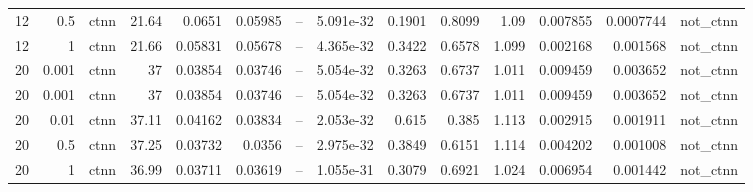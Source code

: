 \begin{table}
\begin{tabular}{lrrrrrrrrrrrrr}
12 & 0.5 & ctnn & 21.64 & 0.0651 & 0.05985 & -- & 5.091e-32 & 0.1901 & 0.8099 & 1.09 & 0.007855 & 0.0007744 & not\_ctnn \\
12 & 1 & ctnn & 21.66 & 0.05831 & 0.05678 & -- & 4.365e-32 & 0.3422 & 0.6578 & 1.099 & 0.002168 & 0.001568 & not\_ctnn \\
20 & 0.001 & ctnn & 37 & 0.03854 & 0.03746 & -- & 5.054e-32 & 0.3263 & 0.6737 & 1.011 & 0.009459 & 0.003652 & not\_ctnn \\
20 & 0.001 & ctnn & 37 & 0.03854 & 0.03746 & -- & 5.054e-32 & 0.3263 & 0.6737 & 1.011 & 0.009459 & 0.003652 & not\_ctnn \\
20 & 0.01 & ctnn & 37.11 & 0.04162 & 0.03834 & -- & 2.053e-32 & 0.615 & 0.385 & 1.113 & 0.002915 & 0.001911 & not\_ctnn \\
20 & 0.5 & ctnn & 37.25 & 0.03732 & 0.0356 & -- & 2.975e-32 & 0.3849 & 0.6151 & 1.114 & 0.004202 & 0.001008 & not\_ctnn \\
20 & 1 & ctnn & 36.99 & 0.03711 & 0.03619 & -- & 1.055e-31 & 0.3079 & 0.6921 & 1.024 & 0.006954 & 0.001442 & not\_ctnn \\
\bottomrule
\end{tabular}
\end{table}
